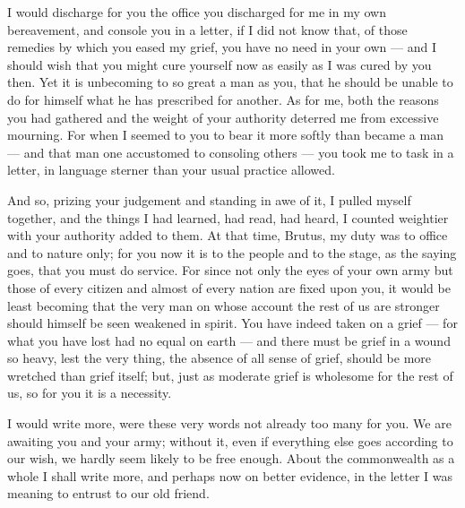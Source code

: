 

 I would discharge for you the office you discharged for me in my own bereavement, and console you in a letter, if I did not know that, of those remedies by which you eased my grief, you have no need in your own --- and I should wish that you might cure yourself now as easily as I was cured by you then. Yet it is unbecoming to so great a man as you, that he should be unable to do for himself what he has prescribed for another. As for me, both the reasons you had gathered and the weight of your authority deterred me from excessive mourning. For when I seemed to you to bear it more softly than became a man --- and that man one accustomed to consoling others --- you took me to task in a letter, in language sterner than your usual practice allowed.

 And so, prizing your judgement and standing in awe of it, I pulled myself together, and the things I had learned, had read, had heard, I counted weightier with your authority added to them. At that time, Brutus, my duty was to office and to nature only; for you now it is to the people and to the stage, as the saying goes, that you must do service. For since not only the eyes of your own army but those of every citizen and almost of every nation are fixed upon you, it would be least becoming that the very man on whose account the rest of us are stronger should himself be seen weakened in spirit. You have indeed taken on a grief --- for what you have lost had no equal on earth --- and there must be grief in a wound so heavy, lest the very thing, the absence of all sense of grief, should be more wretched than grief itself; but, just as moderate grief is wholesome for the rest of us, so for you it is a necessity.

 I would write more, were these very words not already too many for you. We are awaiting you and your army; without it, even if everything else goes according to our wish, we hardly seem likely to be free enough. About the commonwealth as a whole I shall write more, and perhaps now on better evidence, in the letter I was meaning to entrust to our old friend.
